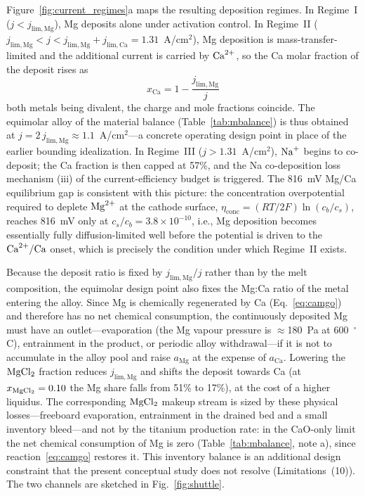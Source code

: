 \documentclass[11pt]{article}
\begin{document}
Figure~\ref{fig:current_regimes}a maps the resulting deposition regimes. In Regime~I ($j < j_{\mathrm{lim,Mg}}$), Mg deposits alone under activation control. In Regime~II ($j_{\mathrm{lim,Mg}} < j < j_{\mathrm{lim,Mg}} + j_{\mathrm{lim,Ca}} = 1.31$~A/cm$^2$), Mg deposition is mass-transfer-limited and the additional current is carried by $\ce{Ca^{2+}}$, so the Ca molar fraction of the deposit rises as
\begin{equation}
\label{eq:xca}
x_{\mathrm{Ca}} = 1 - \frac{j_{\mathrm{lim,Mg}}}{j}
\end{equation}
both metals being divalent, the charge and mole fractions coincide. The equimolar alloy of the material balance (Table~\ref{tab:mbalance}) is thus obtained at $j = 2\,j_{\mathrm{lim,Mg}} \approx 1.1$~A/cm$^2$---a concrete operating design point in place of the earlier bounding idealization. In Regime~III ($j > 1.31$~A/cm$^2$), $\ce{Na+}$ begins to co-deposit; the Ca fraction is then capped at 57\%, and the Na co-deposition loss mechanism (iii) of the current-efficiency budget is triggered. The 816~mV Mg/Ca equilibrium gap is consistent with this picture: the concentration overpotential required to deplete $\ce{Mg^{2+}}$ at the cathode surface, $\eta_{\mathrm{conc}} = (RT/2F)\ln(c_b/c_s)$, reaches 816~mV only at $c_s/c_b = 3.8\times10^{-10}$, i.e., Mg deposition becomes essentially fully diffusion-limited well before the potential is driven to the $\ce{Ca^{2+}/Ca}$ onset, which is precisely the condition under which Regime~II exists.

Because the deposit ratio is fixed by $j_{\mathrm{lim,Mg}}/j$ rather than by the melt composition, the equimolar design point also fixes the Mg:Ca ratio of the metal entering the alloy. Since Mg is chemically regenerated by Ca (Eq.~\ref{eq:camgo}) and therefore has no net chemical consumption, the continuously deposited Mg must have an outlet---evaporation (the Mg vapour pressure is $\approx$180~Pa at 600~$^{\circ}$C), entrainment in the product, or periodic alloy withdrawal---if it is not to accumulate in the alloy pool and raise $a_{\mathrm{Mg}}$ at the expense of $a_{\mathrm{Ca}}$. Lowering the $\ce{MgCl2}$ fraction reduces $j_{\mathrm{lim,Mg}}$ and shifts the deposit towards Ca (at $x_{\ce{MgCl2}} = 0.10$ the Mg share falls from 51\% to 17\%), at the cost of a higher liquidus. The corresponding $\ce{MgCl2}$ makeup stream is sized by these physical losses---freeboard evaporation, entrainment in the drained bed and a small inventory bleed---and not by the titanium production rate: in the CaO-only limit the net chemical consumption of Mg is zero (Table~\ref{tab:mbalance}, note a), since reaction~\ref{eq:camgo} restores it. This inventory balance is an additional design constraint that the present conceptual study does not resolve (Limitations~(10)). The two channels are sketched in Fig.~\ref{fig:shuttle}.
\end{document}
